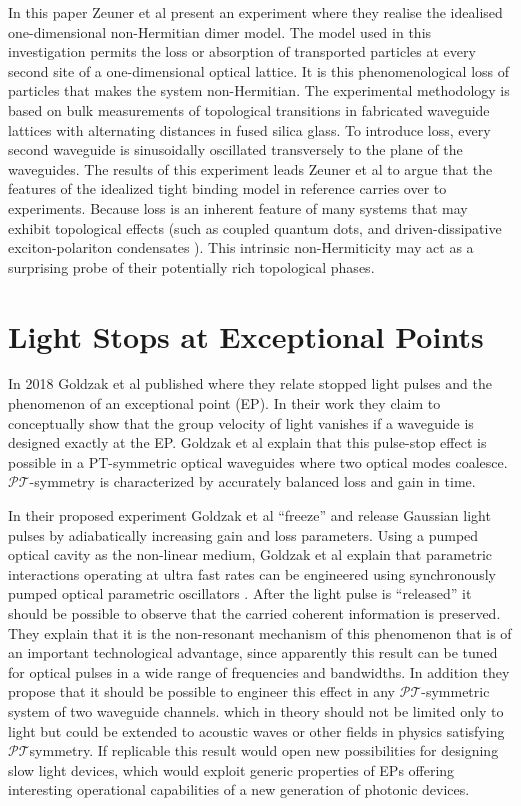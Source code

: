 \documentclass[12pt, a4paper]{report}
\newcommand\PT{\(\mathcal{PT}\)}
\begin{document}
In this paper Zeuner et al present an experiment where they  realise the idealised one-dimensional non-Hermitian dimer model. The model used in this investigation permits the loss or absorption of transported particles at every second site of a one-dimensional optical lattice. It is this phenomenological loss of particles that makes the system non-Hermitian. The experimental methodology is based on bulk measurements of topological transitions in fabricated waveguide lattices with alternating distances in fused silica glass.
To introduce loss, every second waveguide is sinusoidally oscillated transversely to the plane of the waveguides\cite{TopoTrans}.
The results of this experiment leads Zeuner et al to argue that the features of the idealized tight binding model in reference \cite{Rudner} carries over to experiments. Because loss is an inherent feature of many systems that may exhibit topological effects (such as coupled quantum dots\cite{Rudner}, and driven-dissipative exciton-polariton condensates \cite{Cones}). This intrinsic non-Hermiticity may act as a surprising probe of their potentially rich topological phases\cite{TopoTrans}.

\section{Light Stops at Exceptional Points}\label{StopLight}
In 2018 Goldzak et al published \cite{LightStopsatEPs} where they relate stopped light pulses and the phenomenon of an exceptional point (EP). In their work they claim to conceptually show that the group velocity of light vanishes if a waveguide is designed exactly at the EP. Goldzak et al explain that this pulse-stop effect is possible in a PT-symmetric optical waveguides where two optical modes coalesce. \PT-symmetry is characterized by accurately balanced loss and gain in time. 

In their proposed experiment Goldzak et al ``freeze'' and release Gaussian light pulses by adiabatically increasing gain and loss parameters. Using a pumped optical cavity as the non-linear medium, Goldzak et al explain that parametric interactions operating at ultra fast rates can be engineered using synchronously pumped optical parametric oscillators \cite{LightStopsatEPs}. After the light pulse is ``released'' it should be possible to observe that the carried coherent information is preserved. They explain that it is the non-resonant mechanism of this phenomenon that is of an important technological advantage, since apparently this result can be tuned for optical pulses in a wide range of frequencies and bandwidths. In addition they propose that it should be possible to engineer this effect in any \PT-symmetric system of two waveguide channels. which in theory should not be limited only to light but could be extended to acoustic waves or other fields in physics satisfying \PT symmetry\cite{LightStopsatEPs}.
If replicable this result would open new possibilities for designing slow light devices, which would
exploit generic properties of EPs offering interesting operational capabilities of a new generation of photonic devices\cite{LightStopsatEPs}.
\end{document}
